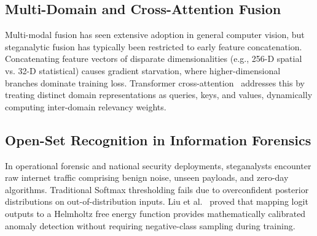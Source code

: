 \documentclass[journal]{IEEEtran}
\begin{document}
\subsection{Multi-Domain and Cross-Attention Fusion}
Multi-modal fusion has seen extensive adoption in general computer vision, but steganalytic fusion has typically been restricted to early feature concatenation. Concatenating feature vectors of disparate dimensionalities (e.g., 256-D spatial vs. 32-D statistical) causes gradient starvation, where higher-dimensional branches dominate training loss. Transformer cross-attention~\cite{vaswani2017attention} addresses this by treating distinct domain representations as queries, keys, and values, dynamically computing inter-domain relevancy weights.

\subsection{Open-Set Recognition in Information Forensics}
In operational forensic and national security deployments, steganalysts encounter raw internet traffic comprising benign noise, unseen payloads, and zero-day algorithms. Traditional Softmax thresholding fails due to overconfident posterior distributions on out-of-distribution inputs. Liu et al.~\cite{liu2020energy} proved that mapping logit outputs to a Helmholtz free energy function provides mathematically calibrated anomaly detection without requiring negative-class sampling during training.
\end{document}
